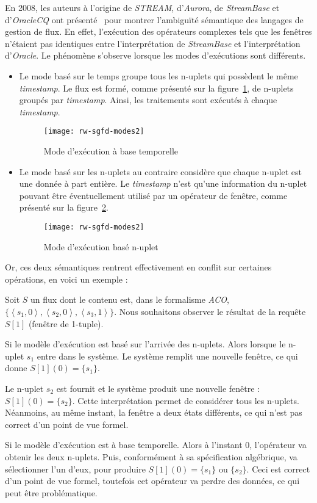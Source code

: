 En 2008, les auteurs à l'origine de \textit{STREAM}, d'\textit{Aurora}, de \textit{StreamBase} et d'\textit{OracleCQ} ont présenté~\cite{Jain:spread} pour montrer l'ambiguïté sémantique des langages de gestion de flux. En effet, l'exécution des opérateurs complexes tels que les fenêtres n'étaient pas identiques entre l'interprétation de \textit{StreamBase} et l'interprétation d'\textit{Oracle}. Le phénomène s'observe lorsque les modes d'exécutions sont différents.
\begin{itemize}
	\item Le mode basé sur le temps groupe tous les n-uplets qui possèdent le même \textit{timestamp}. Le flux est formé, comme présenté sur la figure~\ref{fig:rw:sgfd:mode:time}, de n-uplets groupés par \textit{timestamp}. Ainsi, les traitements sont exécutés à chaque \textit{timestamp}.
	\begin{figure}[ht]
		\centering
		\texttt{[image: rw-sgfd-modes2]}
		\caption{Mode d'exécution à base temporelle}\label{fig:rw:sgfd:mode:time}
	\end{figure}
	\item Le mode basé sur les n-uplets au contraire considère que chaque n-uplet est une donnée à part entière. Le \textit{timestamp} n'est qu'une information du n-uplet pouvant être éventuellement utilisé par un opérateur de fenêtre, comme présenté sur la figure~\ref{fig:rw:sgfd:mode:tuple}.
	\begin{figure}[ht]
		\centering
		\texttt{[image: rw-sgfd-modes2]}
		\caption{Mode d'exécution basé n-uplet}\label{fig:rw:sgfd:mode:tuple}
	\end{figure}
\end{itemize}

Or, ces deux sémantiques rentrent effectivement en conflit sur certaines opérations, en voici un exemple :
\begin{example}\label{ex:rw:sgfd:batches}
 Soit $S$ un flux dont le contenu est, dans le formalisme \textit{ACO}, $\{\left<s_1,0\right>, \left<s_2,0\right>, \left<s_3,1\right>\}$. Nous souhaitons observer le résultat de la requête $S[1]$ (fenêtre de 1-tuple).

Si le modèle d'exécution est basé sur l'arrivée des n-uplets. Alors lorsque le n-uplet $s_1$ entre dans le système. Le système remplit une nouvelle fenêtre, ce qui donne $S[1](0)=\{s_1\}$. 

Le n-uplet $s_2$ est fournit et le système produit une nouvelle fenêtre : $S[1](0)=\{s_2\}$. Cette interprétation permet de considérer tous les n-uplets. Néanmoins, au même instant, la fenêtre a deux états différents, ce qui n'est pas correct d'un point de vue formel.

Si le modèle d'exécution est à base temporelle. Alors à l'instant 0, l'opérateur va obtenir les deux n-uplets. Puis, conformément à sa spécification algébrique, va sélectionner l'un d'eux, pour produire $S[1](0) = \{s_1\}$ ou $\{s_2\}$. Ceci est correct d'un point de vue formel, toutefois cet opérateur va perdre des données, ce qui peut être problématique.
\end{example}

